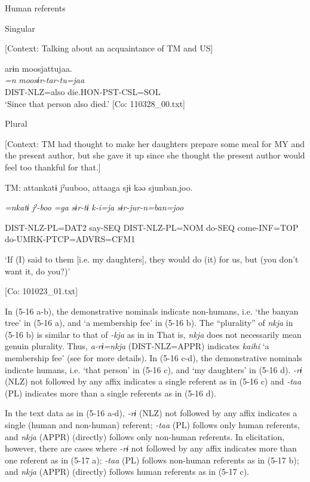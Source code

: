   Human referents

 \ex \label{ex:5:c} Singular

    [Context: Talking about an acquaintance of TM and US]

\glll  arɨn  moosjattujaa.\\
\textit{=n}  \textit{moosɨr-tar-tu=jaa}\\
DIST-NLZ=also  die.HON-PST-CSL=SOL\\
\glt ‘Since that person also died.’ [Co: 110328\_00.txt]

  \ex \label{ex:5:d}  Plural

    [Context: TM had thought to make her daughters prepare some meal for MY and the present author, but she gave it up since she thought the present author would feel too thankful for that.]

    TM:  attankatɨ  jˀuuboo,  attaaga  sjɨ   kəə  sjunban.joo.
                                                                                     
    \textit{=nkatɨ}  \textit{jˀ-boo}  \textit{=ga}  \textit{sɨr-tɨ}  \textit{k-i=ja}  \textit{sɨr-jur-n=ban=joo}
                                                                                     
    DIST-NLZ-PL=DAT2  say-SEQ  DIST-NLZ-PL=NOM  do-SEQ  come-INF=TOP  do-UMRK-PTCP=ADVRS=CFM1

    ‘If (I) said to them [i.e. my daughters], they would do (it) for us, but (you don’t want it, do you?)’

    [Co: 101023\_01.txt]
    \z
\z

In (5-16 a-b), the demonstrative nominals indicate non-humans, i.e. ‘the banyan tree’ in (5-16 a), and ‘a membership fee’ in (5-16 b). The “plurality” of \textit{nkja} in (5-16 b) is similar to that of \textit{{}-kja} as in  in  That is, \textit{nkja} does not necessarily mean genuin plurality. Thus, \textit{a-rɨ=nkja} (DIST-NLZ=APPR) indicates \textit{kaihi} ‘a membership fee’ (see  for more details). In (5-16 c-d), the demonstrative nominals indicate humans, i.e. ‘that person’ in (5-16 c), and ‘my daughters’ in (5-16 d). \textit{{}-rɨ} (NLZ) not followed by any affix indicates a single referent as in (5-16 c) and \textit{{}-taa} (PL) indicates more than a single referents as in (5-16 d).

  In the text data as in (5-16 a-d), \textit{{}-rɨ} (NLZ) not followed by any affix indicates a single (human and non-human) referent; \textit{{}-taa} (PL) follows only human referents, and \textit{nkja} (APPR) (directly) follows only non-human referents. In elicitation, however, there are cases where \textit{{}-rɨ} not followed by any affix indicates more than one referent as in (5-17 a); \textit{{}-taa} (PL) follows non-human referents as in (5-17 b); and \textit{nkja} (APPR) (directly) follows human referents as in (5-17 c).

